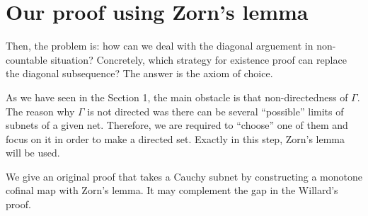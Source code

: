 \documentclass{../exp}
\begin{document}
\section{Our proof using Zorn's lemma}

Then, the problem is: how can we deal with the diagonal arguement in non-countable situation?
Concretely, which strategy for existence proof can replace the diagonal subsequence?
The answer is the axiom of choice.

As we have seen in the Section 1, the main obstacle is that non-directedness of $\Gamma$.
The reason why $\Gamma$ is not directed was there can be several ``possible'' limits of subnets of a given net.
Therefore, we are required to ``choose'' one of them and focus on it in order to make a directed set.
Exactly in this step, Zorn's lemma will be used.
 
We give an original proof that takes a Cauchy subnet by constructing a monotone cofinal map with Zorn's lemma.
It may complement the gap in the Willard's proof.
\end{document}
